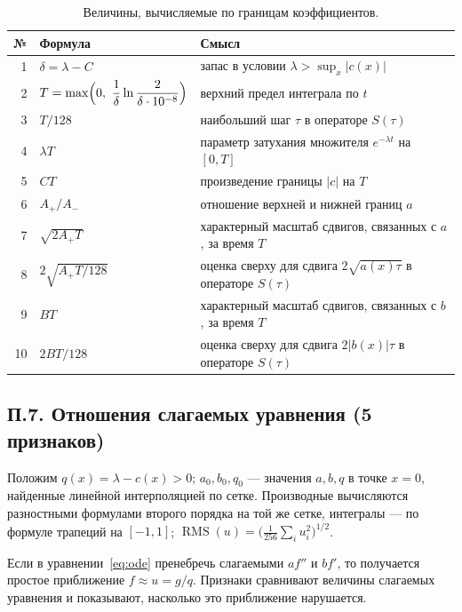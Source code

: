 \documentclass[14pt,a4paper]{extarticle}
\begin{document}
\begin{table}[!htbp]
\centering
\caption{Величины, вычисляемые по границам коэффициентов.}
\label{tab:app-derived}
\renewcommand{\arraystretch}{1.25}
\begin{tabular}{rl>{\raggedright\arraybackslash}p{}}
\toprule
№ & Формула & Смысл\\
\midrule
1 & $\delta=\lambda-C$ & запас в условии $\lambda>\sup_x|c(x)|$\\
2 & $T=\max\Bigl(0,\ \dfrac1\delta\ln\dfrac{2}{\delta\cdot10^{-8}}\Bigr)$ & верхний предел интеграла по $t$\\[8pt]
3 & $T/128$ & наибольший шаг $\tau$ в операторе $S(\tau)$\\
4 & $\lambda T$ & параметр затухания множителя $e^{-\lambda t}$ на $[0,T]$\\
5 & $CT$ & произведение границы $|c|$ на $T$\\
6 & $A_+/A_-$ & отношение верхней и нижней границ $a$\\
7 & $\sqrt{2A_+T}$ & характерный масштаб сдвигов, связанных с $a$, за время $T$\\
8 & $2\sqrt{A_+T/128}$ & оценка сверху для сдвига $2\sqrt{a(x)\tau}$ в операторе $S(\tau)$\\
9 & $BT$ & характерный масштаб сдвигов, связанных с $b$, за время $T$\\
10 & $2BT/128$ & оценка сверху для сдвига $2|b(x)|\tau$ в операторе $S(\tau)$\\
\bottomrule
\end{tabular}
\end{table}

\subsection*{П.7. Отношения слагаемых уравнения (5 признаков)}
Положим $q(x)=\lambda-c(x)>0$; $a_0,b_0,q_0$ --- значения $a,b,q$ в точке
$x=0$, найденные линейной интерполяцией по сетке. Производные вычисляются
разностными формулами второго порядка на той же сетке, интегралы ---
по формуле трапеций на $[-1,1]$; $\operatorname{RMS}(u)=
\bigl(\frac1{256}\sum_iu_i^2\bigr)^{1/2}$.

Если в уравнении~\eqref{eq:ode} пренебречь слагаемыми $af''$ и $bf'$,
то получается простое приближение $f\approx u=g/q$. Признаки сравнивают
величины слагаемых уравнения и показывают, насколько это приближение
нарушается.
\end{document}
